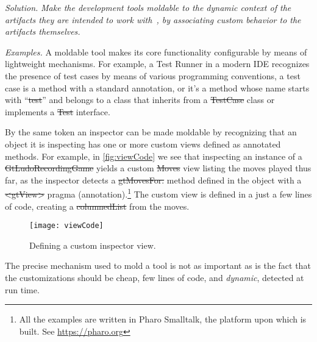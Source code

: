 \documentclass[sigconf,screen]{acmart}
\newcommand\cp[1]{\nbe{Cesare}{#1}{olive}} %
\newcommand\ws[1]{\nbe{Workshop}{#1}{teal}} %
\newcommand{\GT}{\lst{GT}\xspace} %
\newcommand{\patsec}[1]{\noindent\textit{#1.}\xspace}
\begin{document}
\patsec{Solution}
\emph{Make the development tools \emph{moldable} to the \emph{dynamic context} of the artifacts they are intended to work with~\cite{Chis17a}, by associating custom behavior to the artifacts themselves.}

\patsec{Examples}
A moldable tool makes its core functionality configurable by means of lightweight mechanisms.
For example, a Test Runner in a modern IDE recognizes the presence of test cases by means of various programming conventions, \ie a test case is a method with a standard annotation, or it's a method whose name starts with ``\st{test}'' and belongs to a class that inherits from a \st{TestCase} class or implements a \st{Test} interface.

By the same token an inspector can be made moldable by recognizing that an object it is inspecting has one or more custom views defined as annotated methods.
For example, in \autoref{fig:viewCode} we see that inspecting an instance of a \st{GtLudoRecordingGame} yields a custom \st{Moves} view listing the moves played thus far, as the inspector detects a \st{gtMovesFor:} method defined in the object with a \st{<gtView>} pragma (\ie annotation).\footnote{All the examples are written in Pharo Smalltalk, the platform upon which \GT is built. See \url{https://pharo.org}}
The custom view is defined in a just a few lines of code, creating a \st{columnedList} from the moves.

\begin{figure}[h]
  \texttt{[image: viewCode]}
  \caption{Defining a custom inspector view.}
  \label{fig:viewCode}
\end{figure}

The precise mechanism used to mold a tool is not as important as is the fact that the customizations should be cheap, \ie few lines of code, and \emph{dynamic}, \ie detected at run time.
\end{document}
